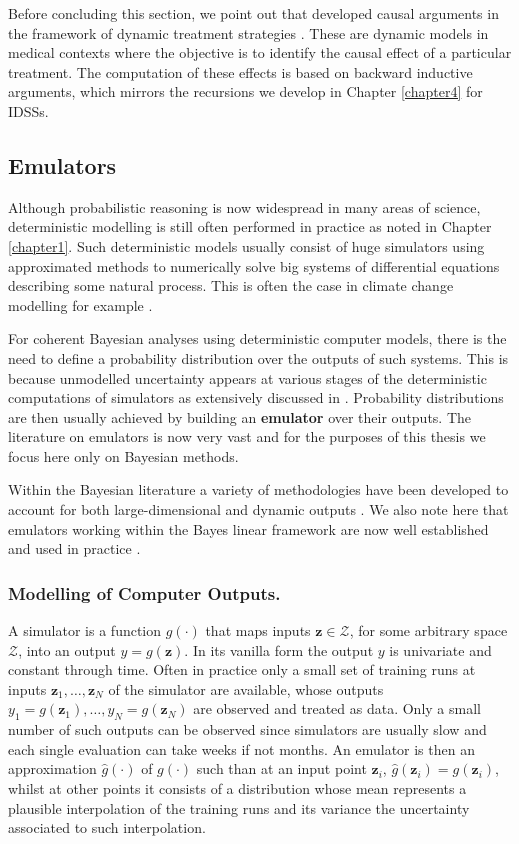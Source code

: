 Before concluding this section, we point out that \citet{Dawid2010} developed causal arguments in the framework of dynamic treatment strategies \citep{Murphy2003}. These are dynamic models in medical contexts where the objective is to identify the causal effect of a particular treatment. The computation of these effects is based on backward inductive arguments, which mirrors the recursions we develop in Chapter \ref{chapter4} for \glspl{IDSS}. 
 
\subsection{Emulators} 
\label{sec:emu}
Although probabilistic reasoning is now widespread in many areas of science, deterministic modelling is still often performed in practice as noted in Chapter \ref{chapter1}. Such deterministic models usually consist of huge simulators using approximated methods to numerically solve big systems of differential equations describing some natural process. This is often the case in climate change modelling for example \citep{Rougier2015}.

For coherent Bayesian analyses using deterministic computer models, there is the need to define a probability distribution over the outputs of such systems. This is because unmodelled uncertainty appears at various stages of the deterministic computations of simulators as extensively discussed in \cite{Kennedy2000}. Probability distributions are then usually achieved by building an \textbf{emulator} over their outputs. The literature on emulators is now very vast \citep{Kennedy2006, Kennedy2001,OHagan2006,Santner2003} and for the purposes of this thesis we focus here only on Bayesian methods. 

Within the Bayesian literature a variety of methodologies have been developed to account for both large-dimensional and dynamic outputs \citep{Conti2009,Liu2009, Rougier2008}. We also note here that emulators working within the Bayes linear framework are now well established and used in practice \citep{Craig2001, Goldstein2006, Williamson2011}.

\subsubsection{Modelling of Computer Outputs.}
A simulator is a function $g(\cdot)$ that maps inputs $\bm{z}\in\bm{\mathcal{Z}}$, for some arbitrary space $\bm{\mathcal{Z}}$, into an output $y=g(\bm{z})$. In its vanilla form the output $y$ is univariate and constant through time. Often in practice only a small set of training runs at inputs $\bm{z}_1,\dots, \bm{z}_N$ of the simulator are available, whose outputs $y_1=g(\bm{z}_1),\dots, y_N=g(\bm{z}_N)$ are observed and treated as data. Only a small number of such outputs can be observed since simulators are usually slow and each single evaluation can take weeks if not months. An emulator is then an approximation $\hat{g}(\cdot)$ of $g(\cdot)$ such than at an input point $\bm{z}_i$, $\hat{g}(\bm{z}_i)=g(\bm{z}_i)$, whilst at other points it consists of a distribution whose mean represents a plausible interpolation of the training runs and its variance the uncertainty associated to such interpolation.

